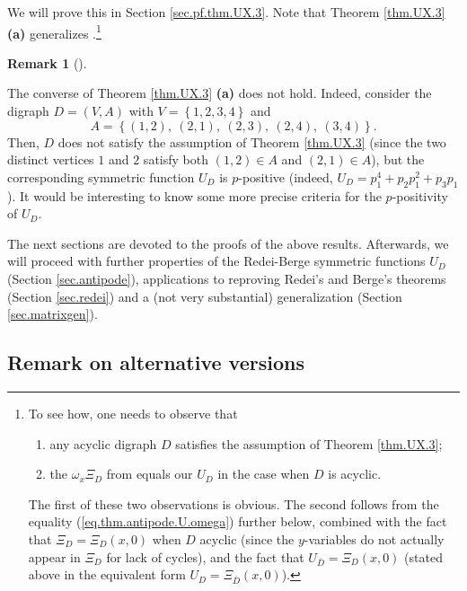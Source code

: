 \documentclass[numbers=enddot,12pt,final,onecolumn,notitlepage]{scrartcl}%
\numberwithin{exer}{section}
\theoremstyle{definition}
\newtheorem{remk}[theo]{Remark}
\newenvironment{remark}[1][]
{\begin{remk}[#1]\begin{leftbar}}
{\end{leftbar}\end{remk}}
\begin{document}
We will prove this in Section \ref{sec.pf.thm.UX.3}. Note that Theorem
\ref{thm.UX.3} \textbf{(a)} generalizes \cite[Theorem 7]{Chow96}.\footnote{To
see how, one needs to observe that
\par
\begin{enumerate}
\item any acyclic digraph $D$ satisfies the assumption of Theorem
\ref{thm.UX.3};
\par
\item the $\omega_{x}\Xi_{D}$ from \cite{Chow96} equals our $U_{D}$ in the
case when $D$ is acyclic.
\end{enumerate}
\par
The first of these two observations is obvious. The second follows from the
equality (\ref{eq.thm.antipode.U.omega}) further below, combined with the fact
that $\Xi_{D}=\Xi_{D}\left(  x,0\right)  $ when $D$ acyclic (since the
$y$-variables do not actually appear in $\Xi_{D}$ for lack of cycles), and the
fact that $U_{\overline{D}}=\Xi_{D}\left(  x,0\right)  $ (stated above in the
equivalent form $U_{D}=\Xi_{\overline{D}}\left(  x,0\right)  $).}

\begin{remark}
The converse of Theorem \ref{thm.UX.3} \textbf{(a)} does not hold. Indeed,
consider the digraph $D=\left(  V,A\right)  $ with $V=\left\{
1,2,3,4\right\}  $ and%
\[
A=\left\{  \left(  1,2\right)  ,\ \left(  2,1\right)  ,\ \left(  2,3\right)
,\ \left(  2,4\right)  ,\ \left(  3,4\right)  \right\}  .
\]
Then, $D$ does not satisfy the assumption of Theorem \ref{thm.UX.3} (since the
two distinct vertices $1$ and $2$ satisfy both $\left(  1,2\right)  \in A$ and
$\left(  2,1\right)  \in A$), but the corresponding symmetric function $U_{D}$
is $p$-positive (indeed, $U_{D}=p_{1}^{4}+p_{2}p_{1}^{2}+p_{3}p_{1}$). It
would be interesting to know some more precise criteria for the $p$-positivity
of $U_{D}$.
\end{remark}

The next sections are devoted to the proofs of the above results. Afterwards,
we will proceed with further properties of the Redei-Berge symmetric functions
$U_{D}$ (Section \ref{sec.antipode}), applications to reproving Redei's and
Berge's theorems (Section \ref{sec.redei}) and a (not very substantial)
generalization (Section \ref{sec.matrixgen}).

\subsection*{Remark on alternative versions}
\end{document}
